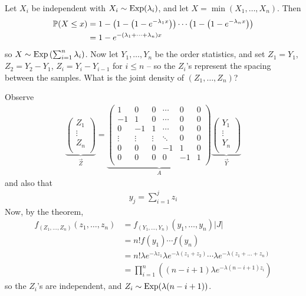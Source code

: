 \documentclass{../template/note}
\begin{document}
    \begin{example*}
        Let \(X_i\) be independent with \(X_i \sim \operatorname{Exp}(\lambda_i)\), and let \(X = \min(X_1, \dots, X_n)\). Then
        \begin{align*}
            \mathbb P(X \leq x) &= 1 - \left(1-\left(1-e^{-\lambda_1x}\right)\right)\cdots\left(1-\left(1-e^{-\lambda_nx}\right)\right) \\
            &= 1 - e^{-(\lambda_1 + \dots + \lambda_n)x}
        \end{align*}
        so \(X \sim \operatorname{Exp}\left(\sum_{i=1}^n \lambda_i\right)\). Now let \(Y_1, \dots, Y_n\) be the order statistics, and set \(Z_1 = Y_1\), \(Z_2 = Y_2 - Y_1\), \(Z_i = Y_i - Y_{i-1}\) for \(i \leq n\) -- so the \(Z_i\)'s represent the spacing between the samples. What is the joint density of \((Z_1, \dots, Z_n)\)?

        Observe
        \begin{align*}
            \underbrace{\begin{pmatrix}
             Z_1 \\
             \vdots \\
             Z_n \\
            \end{pmatrix}}_{\vec Z} = \underbrace{\begin{pmatrix}
             1 & 0 & 0 & \cdots & 0 & 0 \\
             -1 & 1 & 0 & \cdots & 0 & 0 \\
             0 & -1 & 1 & \cdots & 0 & 0 \\
             \vdots & \vdots & \vdots & \ddots & 0 & 0 \\
             0 & 0 & 0 & -1 & 1 & 0 \\
             0 & 0 & 0 & 0 & -1 & 1 \\
            \end{pmatrix}}_A \underbrace{\begin{pmatrix}
             Y_1 \\
             \vdots \\
             Y_n \\
            \end{pmatrix}}_{\vec Y}
        \end{align*}
        and also that
        \begin{align*}
            y_j = \sum_{i=1}^j z_i
        \end{align*}
        Now, by the theorem,
        \begin{align*}
            f_{(Z_1, \dots, Z_n)}(z_1, \dots, z_n) &= f_{(Y_1, \dots, Y_n)}(y_1, \dots, y_n)|J| \\
            &= n!f(y_1) \cdots f(y_n) \\
            &= n!\lambda e^{-\lambda z_1}\lambda e^{-\lambda(z_1+z_2)} \cdots \lambda e^{-\lambda(z_1+\dots+z_n)} \\
            &= \prod_{i=1}^n \left((n-i+1)\lambda e^{-\lambda(n-i+1)z_i}\right)
        \end{align*}
        so the \(Z_i\)'s are independent, and \(Z_i \sim \operatorname{Exp}(\lambda(n-i+1))\).
    \end{example*}
        
\end{document}
